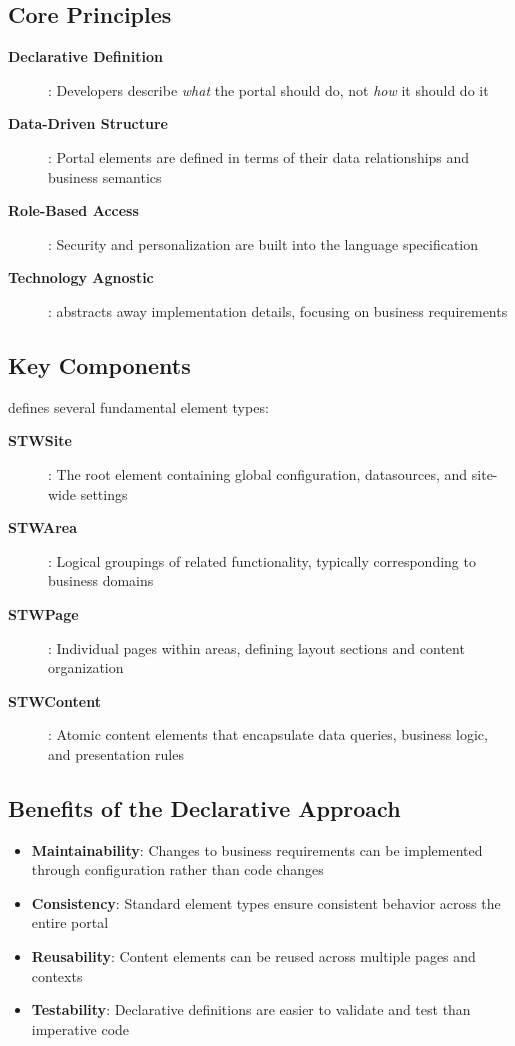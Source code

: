 \subsection{Core Principles}

\begin{description}
\item[\textbf{Declarative Definition}]: Developers describe \textit{what} the portal should do, not \textit{how} it should do it
\item[\textbf{Data-Driven Structure}]: Portal elements are defined in terms of their data relationships and business semantics
\item[\textbf{Role-Based Access}]: Security and personalization are built into the language specification
\item[\textbf{Technology Agnostic}]: \wbdl{} abstracts away implementation details, focusing on business requirements
\end{description}

\subsection{Key Components}

\wbdl{} defines several fundamental element types:

\begin{description}
\item[\textbf{STWSite}]: The root element containing global configuration, datasources, and site-wide settings
\item[\textbf{STWArea}]: Logical groupings of related functionality, typically corresponding to business domains
\item[\textbf{STWPage}]: Individual pages within areas, defining layout sections and content organization
\item[\textbf{STWContent}]: Atomic content elements that encapsulate data queries, business logic, and presentation rules
\end{description}

\subsection{Benefits of the Declarative Approach}

\begin{itemize}
    \item \textbf{Maintainability}: Changes to business requirements can be implemented through configuration rather than code changes
    \item \textbf{Consistency}: Standard element types ensure consistent behavior across the entire portal
    \item \textbf{Reusability}: Content elements can be reused across multiple pages and contexts
    \item \textbf{Testability}: Declarative definitions are easier to validate and test than imperative code
\end{itemize}

